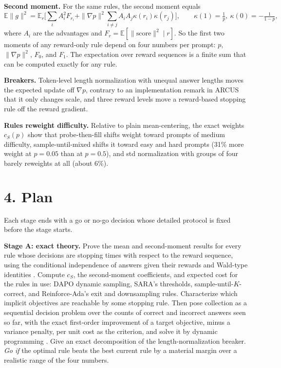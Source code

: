 \documentclass[11pt]{article}
\newcommand{\E}{\mathbb{E}}
\begin{document}
\textbf{Second moment.} For the same rules, the second moment equals
\[
\E\|g\|^2=\E_r\Big[\sum_iA_i^2F_{r_i}+\|\nabla p\|^2\sum_{i\neq j}A_iA_j\kappa(r_i)\kappa(r_j)\Big],
\qquad \kappa(1)=\tfrac1p,\ \kappa(0)=-\tfrac1{1-p},
\]
where $A_i$ are the advantages and $F_r=\E[\|\text{score}\|^2\mid r]$. So the first two moments of any reward-only rule depend on four numbers per prompt: $p$, $\|\nabla p\|^2$, $F_0$, and $F_1$. The expectation over reward sequences is a finite sum that can be computed exactly for any rule.

\textbf{Breakers.} Token-level length normalization with unequal answer lengths moves the expected update off $\nabla p$, contrary to an implementation remark in ARCUS that it only changes scale, and three reward levels move a reward-based stopping rule off the reward gradient.

\textbf{Rules reweight difficulty.} Relative to plain mean-centering, the exact weights $c_S(p)$ show that probe-then-fill shifts weight toward prompts of medium difficulty, sample-until-mixed shifts it toward easy and hard prompts (31\% more weight at $p=0.05$ than at $p=0.5$), and std normalization with groups of four barely reweights at all (about 6\%).

\section{4. Plan}
Each stage ends with a go or no-go decision whose detailed protocol is fixed before the stage starts.

\textbf{Stage A: exact theory.} Prove the mean and second-moment results for every rule whose decisions are stopping times with respect to the reward sequence, using the conditional independence of answers given their rewards and Wald-type identities \citep{wald1945sequential}. Compute $c_S$, the second-moment coefficients, and expected cost for the rules in use: DAPO dynamic sampling, SARA's thresholds, sample-until-$K$-correct, and Reinforce-Ada's exit and downsampling rules. Characterize which implicit objectives are reachable by some stopping rule. Then pose collection as a sequential decision problem over the counts of correct and incorrect answers seen so far, with the exact first-order improvement of a target objective, minus a variance penalty, per unit cost as the criterion, and solve it by dynamic programming \citep{chow1971great}. Give an exact decomposition of the length-normalization breaker. \emph{Go if} the optimal rule beats the best current rule by a material margin over a realistic range of the four numbers.
\end{document}
